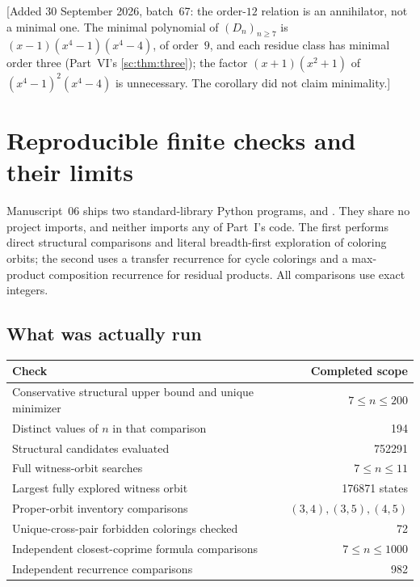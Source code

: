 \documentclass[11pt,a4paper]{article}
\numberwithin{equation}{section}
\theoremstyle{definition}
\theoremstyle{remark}
\begin{document}
[Added 30 September 2026, batch~67: the order-$12$ relation is an annihilator, not a minimal
one. The minimal polynomial of $(D_n)_{n\ge7}$ is $(x-1)(x^4-1)(x^4-4)$, of
order~$9$, and each residue class has minimal order three (Part~VI's
\cref{sc:thm:three}); the factor $(x+1)(x^2+1)$ of $(x^4-1)^2(x^4-4)$ is
unnecessary. The corollary did not claim minimality.]

\section{Reproducible finite checks and their limits}\label{tor:sec:verification}

Manuscript~06 ships two standard-library Python programs,
 and
. They share no project
imports, and neither imports any of Part~I's code. The first performs direct
structural comparisons and literal breadth-first exploration of coloring
orbits; the second uses a transfer recurrence for cycle colorings and a
max-product composition recurrence for residual products. All comparisons use
exact integers.

\subsection{What was actually run}

\begin{center}
\begin{tabular}{@{}p{}r@{}}
\toprule
Check & Completed scope\\
\midrule
Conservative structural upper bound and unique minimizer & $7\le n\le200$\\
Distinct values of $n$ in that comparison & 194\\
Structural candidates evaluated & 752291\\
Full witness-orbit searches & $7\le n\le11$\\
Largest fully explored witness orbit & 176871 states\\
Proper-orbit inventory comparisons & $(3,4),(3,5),(4,5)$\\
Unique-cross-pair forbidden colorings checked & 72\\
Independent closest-coprime formula comparisons & $7\le n\le1000$\\
Independent recurrence comparisons & 982\\
\bottomrule
\end{tabular}
\end{center}
\end{document}
